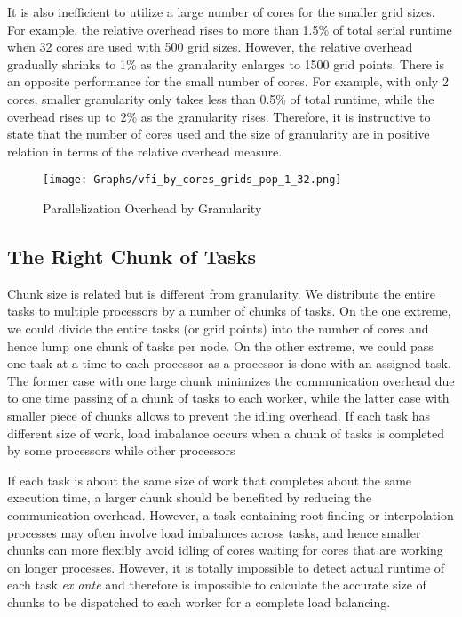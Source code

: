 \documentclass[12pt]{article}
\begin{document}
It is also inefficient to utilize a large number of cores for the smaller grid sizes. For example, the relative overhead rises to more than 1.5\% of total serial runtime when 32 cores are used with 500 grid sizes. However, the relative overhead gradually shrinks to 1\% as the granularity enlarges to 1500 grid points. There is an opposite performance for the small number of cores. For example, with only 2 cores, smaller granularity only takes less than 
0.5\% of total runtime, while the overhead rises up to 2\% as the granularity rises. Therefore, it is instructive to state that the number of cores used and the size of granularity are in positive relation in terms of the relative overhead measure.


\begin{figure}[h!]
\begin{center}
\caption{\sf Parallelization Overhead by Granularity}
\texttt{[image: Graphs/vfi\_by\_cores\_grids\_pop\_1\_32.png]}\label{fig:po_grid}
\end{center}
\end{figure}




\subsection{The Right Chunk of Tasks}
Chunk size is related but is different from granularity. We distribute the entire tasks to multiple processors by a number of chunks of tasks. On the one extreme, we could divide the entire tasks (or grid points) into the number of cores and hence lump one chunk of tasks per node. On the other extreme, we could pass one task at a time to each processor as a processor is done with an assigned task. The former case with one large chunk minimizes the communication overhead due to one time passing of a chunk of tasks to each worker, while the latter case with smaller piece of chunks allows to prevent the idling overhead. If each task has different size of work, load imbalance occurs when a chunk of tasks is completed by some processors while other processors

If each task is about the same size of work that completes about the same execution time, a larger chunk should be benefited by reducing the communication overhead. However, a task containing root-finding or interpolation processes may often involve load imbalances across tasks, and hence smaller chunks can more flexibly avoid idling of cores waiting for cores that are working on longer processes. However, it is totally impossible to detect actual runtime of each task \textit{ex ante} and therefore is impossible to calculate the accurate size of chunks to be dispatched to each worker for a complete load balancing.
\end{document}
